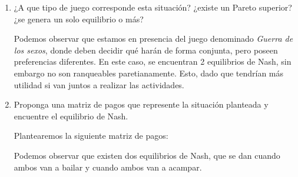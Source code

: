 \documentclass{exam}
\begin{document}
  \begin{enumerate}[resume*]
    \item ¿A que tipo de juego corresponde esta situación? ¿existe un Pareto superior? ¿se genera un solo equilibrio o más?
    \begin{solution}
Podemos observar que estamos en presencia del juego denominado \textit{Guerra de los sexos}, donde deben decidir qué harán de forma conjunta, pero poseen preferencias diferentes. En este caso, se encuentran 2 equilibrios de Nash, sin embargo no son ranqueables paretianamente. Esto, dado que tendrían más utilidad si van juntos a realizar las actividades. 
    \end{solution}
    
    \item Proponga una matriz de pagos que represente la situación planteada y encuentre el equilibrio de Nash.
    \begin{solution}
    Plantearemos la siguiente matriz de pagos:
    
        \begin{center}

    
\end{center}

Podemos observar que existen dos equilibrios de Nash, que se dan cuando ambos van a bailar y cuando ambos van a acampar. 
    \end{solution}
  \end{enumerate}
\end{document}
